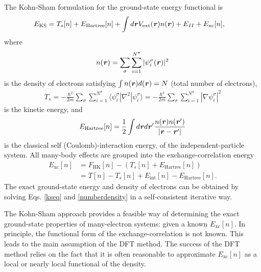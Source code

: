 The Kohn-Sham formulation for the ground-state energy functional is 
\begin{equation}\label{kse}
\begin{aligned}
E_\text{KS}&=T_s[n]+E_\text{Hartree}[n]+\int d\textbf{\textit r}V_\text{ext}(\textbf{\textit r})n(\textbf{\textit r})+E_{II}+E_\text{xc}[n],
\end{aligned}
\end{equation}
where 
\begin{equation}\label{numberdensity}
\begin{aligned}
n(\textbf{\textit r})=\sum_\sigma\sum_{i=1}^{N^\sigma}|\psi_i^\sigma(\textbf{\textit r})|^2
\end{aligned}
\end{equation}
is the density of electrons satisfying $\int n(\textbf{\textit r})d(\textbf{\textit r})=N$ (total number of electrons),
\begin{equation}\label{spTs}
\begin{aligned}
T_s=-\frac{\hbar^2}{2m}\sum_\sigma\sum_{i=1}^{N^\sigma}\langle\psi_i^\sigma|\nabla^2|\psi_i^\sigma\rangle=-\frac{\hbar^2}{2m}\sum_\sigma\sum_{i=1}^{N^\sigma}|\nabla\psi_i^\sigma|^2
\end{aligned}
\end{equation}
is the kinetic energy, and 
\begin{equation}\label{spEhatr}
\begin{aligned}
E_\text{Hartree}[n]=\frac{1}{2}\int{d\textbf{\textit r}d\textbf{\textit r}'}\frac{n(\textbf{\textit r})n(\textbf{\textit r}')}{|\textbf{\textit r}-\textbf{\textit r}'|}
\end{aligned}
\end{equation}
is the classical self (Coulomb)-interaction energy, of the independent-particle system. All many-body effects are grouped into the exchange-correlation energy 
\begin{equation}\label{spExc}
\begin{aligned}
E_\text{xc}[n]&=F_\text{HK}[n]-(T_s[n]+E_\text{Hartree}[n]) \\
&=T[n]-T_s[n]+E_\text{int}[n]-E_\text{Hartree}[n].
\end{aligned}
\end{equation}
%
The exact ground-state energy and density of electrons
can be obtained by solving Eqs. \ref{kseq} and \ref{numberdensity} in a
self-consistent iterative way.

The Kohn-Sham approach provides a feasible way of determining the exact ground-state
properties of many-electron systems: given a known $E_\text{xc}[n]$. In principle, the
functional form of the exchange-correlation is not known. This leads to the main
assumption of the DFT method. The success of the DFT method relies on the fact that
it is often reasonable to approximate $E_\text{xc}[n]$ as a local or nearly local
functional of the density. 

